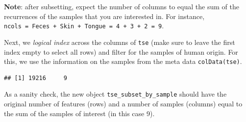 \documentclass[
]{book}
\newenvironment{Shaded}{\begin{snugshade}}{\end{snugshade}}
\newcommand{\CommentTok}[1]{\textcolor[rgb]{0.56,0.35,0.01}{\textit{#1}}}
\newcommand{\FunctionTok}[1]{\textcolor[rgb]{0.00,0.00,0.00}{#1}}
\newcommand{\NormalTok}[1]{#1}
\newcommand{\OtherTok}[1]{\textcolor[rgb]{0.56,0.35,0.01}{#1}}
\newcommand{\SpecialCharTok}[1]{\textcolor[rgb]{0.00,0.00,0.00}{#1}}
\newcommand{\StringTok}[1]{\textcolor[rgb]{0.31,0.60,0.02}{#1}}
\begin{document}
\begin{table}
\centering
{}
\end{table}

\textbf{Note}: after subsetting, expect the number of columns to equal the
sum of the recurrences of the samples that you are interested
in. For instance, \texttt{ncols\ =\ Feces\ +\ Skin\ +\ Tongue\ =\ 4\ +\ 3\ +\ 2\ =\ 9}.

Next, we \emph{logical index} across the columns of \texttt{tse} (make sure to
leave the first index empty to select all rows) and filter for the
samples of human origin. For this, we use the information on the
samples from the meta data \texttt{colData(tse)}.

\begin{Shaded}
\end{Shaded}

\begin{verbatim}
## [1] 19216     9
\end{verbatim}

As a sanity check, the new object \texttt{tse\_subset\_by\_sample} should have
the original number of features (rows) and a number of samples
(columns) equal to the sum of the samples of interest (in this case
9).
\end{document}
